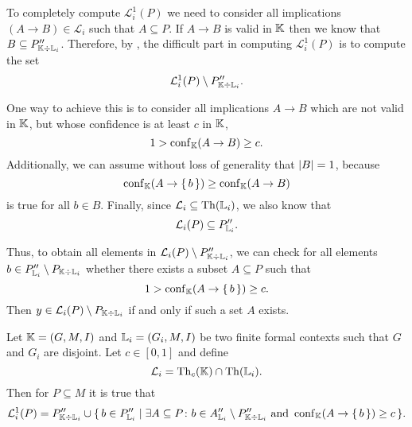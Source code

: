 To completely compute $\mathcal{L}_{i}^{1}(P)$ we need to consider all implications $(A
\to B) \in \mathcal{L}_{i}$ such that $A \subseteq P$.  If $A \to B$ is valid in ${\mathbb{K}}$
then we know that $B \subseteq P_{{\mathbb{K}} \div {\ensuremath{\mathbb{L}}}_{i}}''$.  Therefore, by ,
the difficult part in computing $\mathcal{L}_{i}^{1}(P)$ is to compute the set
\begin{equation*}
  \mathcal{L}_{i}^{1}(P) \setminus P_{{\mathbb{K}} \div {\ensuremath{\mathbb{L}}}_{i}}''.
\end{equation*}

One way to achieve this is to consider all implications $A \to B$ which are not valid in
${\mathbb{K}}$, but whose confidence is at least $c$ in ${\mathbb{K}}$, \ie
\begin{equation*}
  1 > \operatorname{conf}_{{\mathbb{K}}}(A \to B) \ge c.
\end{equation*}
Additionally, we can assume without loss of generality that $\lvert B\rvert = 1$, because
\begin{equation*}
  \operatorname{conf}_{{\mathbb{K}}}(A \to {\ensuremath{\{\, b \,\}}}) \ge \operatorname{conf}_{{\mathbb{K}}}(A \to B)
\end{equation*}
is true for all $b \in B$.  Finally, since $\mathcal{L}_{i} \subseteq \operatorname{Th}({\mathbb{L}}_{i})$, we
also know that
\begin{equation*}
  \mathcal{L}_{i}(P) \subseteq P_{{\mathbb{L}}_{i}}''.
\end{equation*}

Thus, to obtain all elements in $\mathcal{L}_{i}(P) \setminus P_{{\mathbb{K}} \div {\ensuremath{\mathbb{L}}}_{i}}''$, we can check for all elements $b \in P_{{\mathbb{L}}_{i}}'' \setminus P_{{\mathbb{K}}
  \div {\ensuremath{\mathbb{L}}}_{i}}$ whether there exists a subset $A \subseteq P$ such that
\begin{equation*}
  1 > \operatorname{conf}_{{\mathbb{K}}}(A \to {\ensuremath{\{\, b \,\}}}) \ge c.
\end{equation*}
Then $y \in \mathcal{L}_{i}(P) \setminus P_{{\mathbb{K}} \div {\ensuremath{\mathbb{L}}}_{i}}$ if and only if such a
set $A$ exists.

\begin{Proposition}
  \label{prop:computing-confident-closure-first-try}
  Let ${\mathbb{K}} = (G, M, I)$ and ${\mathbb{L}}_{i} = (G_{i}, M, I)$ be two finite formal contexts
  such that $G$ and $G_{i}$ are disjoint.  Let $c \in [0,1]$ and define
  \begin{equation*}
    \mathcal{L}_{i} = \operatorname{Th}_{c}({\mathbb{K}}) \cap \operatorname{Th}({\mathbb{L}}_{i}).
  \end{equation*}
  Then for $P \subseteq M$ it is true that
  \begin{equation*}
    \mathcal{L}_{i}^{1}(P) = P_{{\mathbb{K}} \div {\ensuremath{\mathbb{L}}}_{i}}'' \cup {\ensuremath{\{\, b \in P_{{\mathbb{L}}_{i}}'' \mid \exists A \subseteq P \colon b \in A_{{\mathbb{L}}_{i}}'' \setminus P_{{\mathbb{K}}
      \div {\ensuremath{\mathbb{L}}}_{i}}'' \text{ and } \operatorname{conf}_{{\mathbb{K}}}(A \to {\ensuremath{\{\, b \,\}}}) \ge c \,\}}}.
  \end{equation*}
\end{Proposition}

